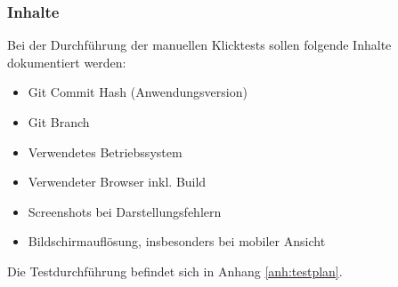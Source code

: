 \subsubsection*{Inhalte}
Bei der Durchführung der manuellen Klicktests sollen folgende Inhalte dokumentiert werden:
\begin{itemize}
    \item Git Commit Hash (Anwendungsversion)
    \item Git Branch
    \item Verwendetes Betriebssystem
    \item Verwendeter Browser inkl. Build
    \item Screenshots bei Darstellungsfehlern
    \item Bildschirmauflösung, insbesonders bei mobiler Ansicht
\end{itemize}
Die Testdurchführung befindet sich in Anhang \ref{anh:testplan}.